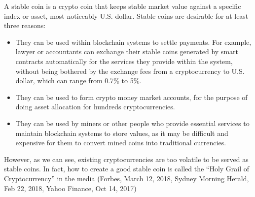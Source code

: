 \documentclass[11pt]{article}%
\numberwithin{equation}{section}
\theoremstyle{plain}
\begin{document}
A stable coin is a crypto coin that keeps stable market value against a specific index or asset, most noticeably U.S. dollar. Stable coins are desirable for at least three reasons:
\begin{itemize}
\item They can be used within blockchain systems to settle payments. For example, lawyer or accountants can exchange their stable coins generated by smart contracts automatically for the services they provide within the system, without being bothered by the exchange fees from a cryptocurrency to U.S. dollar, which can range from 0.7\% to 5\%.
\item  They can be used to form crypto money market accounts, for the purpose of doing asset allocation for hundreds cryptocurrencies.
\item They can be used by miners or other people who provide essential services to maintain blockchain systems to store values, as it may be difficult and expensive for them to convert mined coins into traditional currencies.
\end{itemize}
However, as we can see, existing cryptocurrencies are too volatile to be served as stable coins.
In fact, how to create a good stable coin is called the ``Holy Grail of Cryptocurrency'' in the media (Forbes, March 12, 2018,
Sydney Morning Herald, Feb 22, 2018, Yahoo Finance, Oct 14, 2017)







\end{document}
